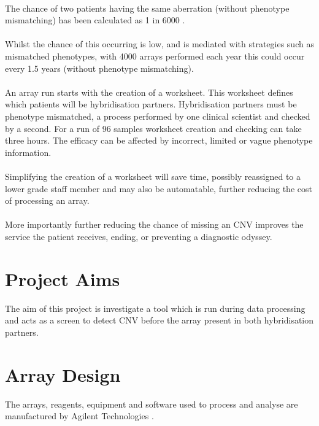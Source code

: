 \paragraph*{}
The chance of two patients having the same aberration (without phenotype mismatching) has been calculated as 1 in 6000 \cite{joowook_ahn_frequency_2015}.
\paragraph*{}
Whilst the chance of this occurring is low, and is mediated with strategies such as mismatched phenotypes, with 4000 arrays performed each year this could occur every 1.5 years (without phenotype mismatching). 
\paragraph*{}
An array run starts with the creation of a worksheet. This worksheet defines which patients will be hybridisation partners.  Hybridisation partners must be phenotype mismatched, a process performed by one clinical scientist and checked by a second. For a run of 96 samples worksheet creation and checking can take three hours.
The efficacy can be affected by incorrect, limited or vague phenotype information.
\paragraph*{}
Simplifying the creation of a worksheet will save time, possibly reassigned to a lower grade staff member and may also be automatable, further reducing the cost of processing an array.
\paragraph*{}
More importantly further reducing the chance of missing an CNV improves the service the patient receives, ending, or preventing a diagnostic odyssey.

\section{Project Aims}
The aim of this project is investigate a tool which is run during data processing and acts as a screen to detect CNV before the array present in both hybridisation partners.

\section{Array Design}
The arrays, reagents, equipment and software used to process and analyse are manufactured by Agilent Technologies \cite{agilenttechnologies_microarrays}.
